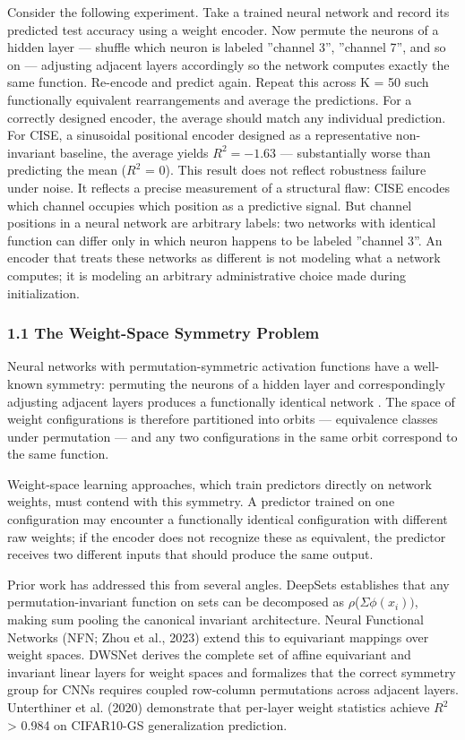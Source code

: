 
Consider the following experiment. Take a trained neural network and record its predicted test accuracy using a weight encoder. Now permute the neurons of a hidden layer --- shuffle which neuron is labeled ''channel 3'', ''channel 7'', and so on --- adjusting adjacent layers accordingly so the network computes exactly the same function. Re-encode and predict again. Repeat this across K = 50 such functionally equivalent rearrangements and average the predictions. For a correctly designed encoder, the average should match any individual prediction. For CISE, a sinusoidal positional encoder designed as a representative non-invariant baseline, the average yields $R^2 = -1.63$ --- substantially worse than predicting the mean ($R^2$ = 0). This result does not reflect robustness failure under noise. It reflects a precise measurement of a structural flaw: CISE encodes which channel occupies which position as a predictive signal. But channel positions in a neural network are arbitrary labels: two networks with identical function can differ only in which neuron happens to be labeled ''channel 3''. An encoder that treats these networks as different is not modeling what a network computes; it is modeling an arbitrary administrative choice made during initialization.

\subsubsection{1.1 The Weight-Space Symmetry Problem}

Neural networks with permutation-symmetric activation functions have a well-known symmetry: permuting the neurons of a hidden layer and correspondingly adjusting adjacent layers produces a functionally identical network \citep{HechtNielsen1990}. The space of weight configurations is therefore partitioned into orbits --- equivalence classes under permutation --- and any two configurations in the same orbit correspond to the same function.

Weight-space learning approaches, which train predictors directly on network weights, must contend with this symmetry. A predictor trained on one configuration may encounter a functionally identical configuration with different raw weights; if the encoder does not recognize these as equivalent, the predictor receives two different inputs that should produce the same output.

Prior work has addressed this from several angles. DeepSets \citep{Zaheer2017Deep} establishes that any permutation-invariant function on sets can be decomposed as $\rho$($\Sigma \phi (x_{i}))$, making sum pooling the canonical invariant architecture. Neural Functional Networks (NFN; Zhou et al., 2023) extend this to equivariant mappings over weight spaces. DWSNet \citep{Navon2023Equivariant} derives the complete set of affine equivariant and invariant linear layers for weight spaces and formalizes that the correct symmetry group for CNNs requires coupled row-column permutations across adjacent layers. Unterthiner et al. (2020) demonstrate that per-layer weight statistics achieve $R^2$ > 0.984 on CIFAR10-GS generalization prediction.

